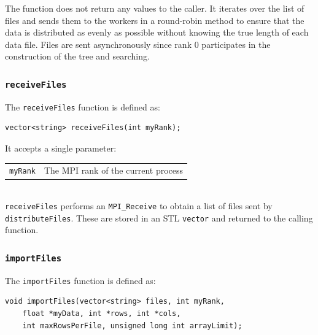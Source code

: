 \documentclass{article}
\begin{document}
The function does not return any values to the caller. It iterates over the list of files and sends them to the workers in a round-robin method to ensure that the data is distributed as evenly as possible without knowing the true length of each data file. Files are sent asynchronously since rank 0 participates in the construction of the tree and searching.

%
%

\subsubsection{\texttt{receiveFiles}}\label{sec:receivefiles}

The \texttt{receiveFiles} function is defined as:

\lstset{language=C++, keepspaces=true}
\begin{lstlisting}
vector<string> receiveFiles(int myRank);
\end{lstlisting}

It accepts a single parameter: \\

\begin{tabular}{l l}
\texttt{myRank} & The MPI rank of the current process \\
\end{tabular} \\

\texttt{receiveFiles} performs an \texttt{MPI\_Receive} to obtain a list of files sent by \texttt{distributeFiles}. These are stored in an STL \texttt{vector} and returned to the calling function.


%
%

\subsubsection{\texttt{importFiles}}\label{sec:importFiles}


The \texttt{importFiles} function is defined as:

\begin{minipage}{\linewidth}
\lstset{language=C++, keepspaces=true}
\begin{lstlisting}
void importFiles(vector<string> files, int myRank,
	float *myData, int *rows, int *cols, 
	int maxRowsPerFile, unsigned long int arrayLimit);
\end{lstlisting}
\end{minipage}
\end{document}
